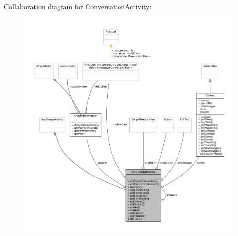 Collaboration diagram for Conversation\+Activity\+:
\nopagebreak
\begin{figure}[H]
\begin{center}
\leavevmode
\includegraphics[width=350pt]{a00075}
\end{center}
\end{figure}
